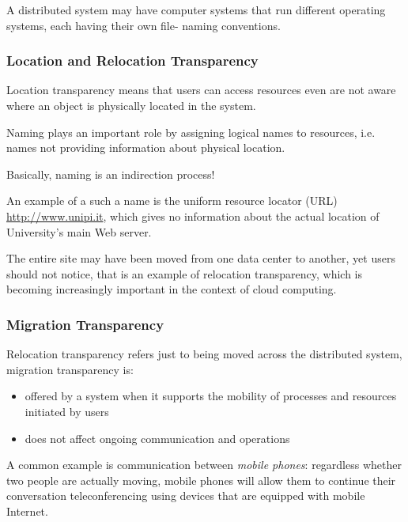 A distributed system may have computer systems that run
different operating systems, each having their own file-
naming conventions.


\subsubsection{Location and Relocation Transparency}

Location transparency means that users can access
resources even are not aware where an object is physically
located in the system.

Naming plays an important role by assigning logical names to
resources, i.e. names not providing information about physical location.

Basically, naming is an indirection process!


An example of a such a name is the uniform resource locator
(URL) \href{http://www.unipi.it}{http://www.unipi.it}, which gives no information about the actual location of University’s main Web server.

The entire site may have been moved from one data center to another, yet users should not notice, that is an example of relocation transparency, which is becoming increasingly important in the context of cloud computing.

\subsubsection{Migration Transparency}
Relocation transparency refers just to being moved across the distributed system, migration transparency is:
\begin{itemize}
   \item offered by a system when it supports the mobility of processes and resources initiated by users
   \item does not affect ongoing communication and operations
\end{itemize}

A common example is communication between \textit{mobile phones}:
regardless whether two people are actually moving, mobile phones will allow them to continue their conversation teleconferencing using devices that are equipped with mobile Internet.

